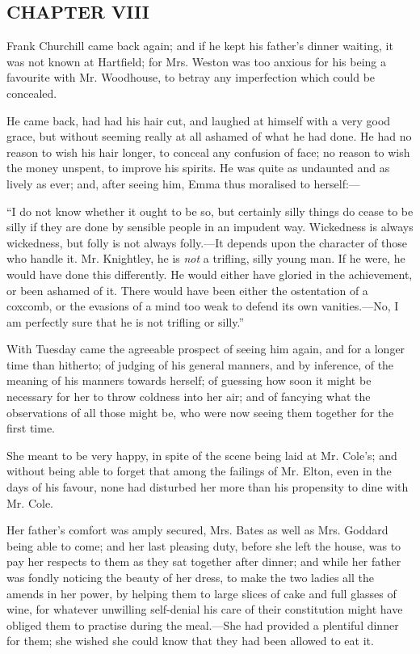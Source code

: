 \subsection[chapter-viii-1]{\useURL[url27][][][]\from[url27]CHAPTER VIII}

Frank Churchill came back again; and if he kept his father's dinner waiting, it was not known at Hartfield; for Mrs. Weston was too anxious for his being a favourite with Mr. Woodhouse, to betray any imperfection which could be concealed.

He came back, had had his hair cut, and laughed at himself with a very good grace, but without seeming really at all ashamed of what he had done. He had no reason to wish his hair longer, to conceal any confusion of face; no reason to wish the money unspent, to improve his spirits. He was quite as undaunted and as lively as ever; and, after seeing him, Emma thus moralised to herself:---

“I do not know whether it ought to be so, but certainly silly things do cease to be silly if they are done by sensible people in an impudent way. Wickedness is always wickedness, but folly is not always folly.---It depends upon the character of those who handle it. Mr. Knightley, he is {\em not} a trifling, silly young man. If he were, he would have done this differently. He would either have gloried in the achievement, or been ashamed of it. There would have been either the ostentation of a coxcomb, or the evasions of a mind too weak to defend its own vanities.---No, I am perfectly sure that he is not trifling or silly.”

With Tuesday came the agreeable prospect of seeing him again, and for a longer time than hitherto; of judging of his general manners, and by inference, of the meaning of his manners towards herself; of guessing how soon it might be necessary for her to throw coldness into her air; and of fancying what the observations of all those might be, who were now seeing them together for the first time.

She meant to be very happy, in spite of the scene being laid at Mr. Cole's; and without being able to forget that among the failings of Mr. Elton, even in the days of his favour, none had disturbed her more than his propensity to dine with Mr. Cole.

Her father's comfort was amply secured, Mrs. Bates as well as Mrs. Goddard being able to come; and her last pleasing duty, before she left the house, was to pay her respects to them as they sat together after dinner; and while her father was fondly noticing the beauty of her dress, to make the two ladies all the amends in her power, by helping them to large slices of cake and full glasses of wine, for whatever unwilling self-denial his care of their constitution might have obliged them to practise during the meal.---She had provided a plentiful dinner for them; she wished she could know that they had been allowed to eat it.

